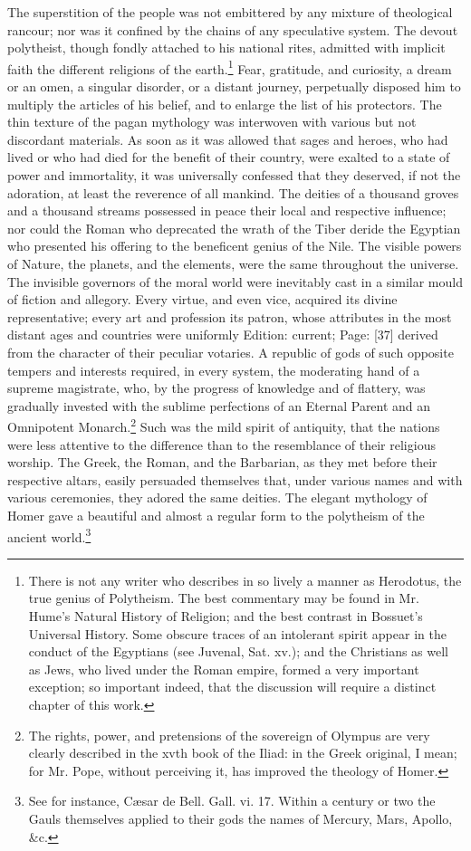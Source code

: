 The superstition of the people was not embittered by any mixture of theological rancour; nor was it confined by the chains of any speculative system. The devout polytheist, though fondly attached to his national rites, admitted with implicit faith the different religions of the earth.\footnote{There is not any writer who describes in so lively a manner as Herodotus, the true genius of Polytheism. The best commentary may be found in Mr. Hume\texthebrew{}’s Natural History of Religion; and the best contrast in Bossuet\texthebrew{}’s Universal History. Some obscure traces of an intolerant spirit appear in the conduct of the Egyptians (see Juvenal, Sat. xv.); and the Christians as well as Jews, who lived under the Roman empire, formed a very important exception; so important indeed, that the discussion will require a distinct chapter of this work.} Fear, gratitude, and curiosity, a dream or an omen, a singular disorder, or a distant journey, perpetually disposed him to multiply the articles of his belief, and to enlarge the list of his protectors. The thin texture of the pagan mythology was interwoven with various but not discordant materials. As soon as it was allowed that sages and heroes, who had lived or who had died for the benefit of their country, were exalted to a state of power and immortality, it was universally confessed that they deserved, if not the adoration, at least the reverence of all mankind. The deities of a thousand groves and a thousand streams possessed in peace their local and respective influence; nor could the Roman who deprecated the wrath of the Tiber deride the Egyptian who presented his offering to the beneficent genius of the Nile. The visible powers of Nature, the planets, and the elements, were the same throughout the universe. The invisible governors of the moral world were inevitably cast in a similar mould of fiction and allegory. Every virtue, and even vice, acquired its divine representative; every art and profession its patron, whose attributes in the most distant ages and countries were uniformly Edition: current; Page: [37] derived from the character of their peculiar votaries. A republic of gods of such opposite tempers and interests required, in every system, the moderating hand of a supreme magistrate, who, by the progress of knowledge and of flattery, was gradually invested with the sublime perfections of an Eternal Parent and an Omnipotent Monarch.\footnote{The rights, power, and pretensions of the sovereign of Olympus are very clearly described in the xvth book of the Iliad: in the Greek original, I mean; for Mr. Pope, without perceiving it, has improved the theology of Homer.} Such was the mild spirit of antiquity, that the nations were less attentive to the difference than to the resemblance of their religious worship. The Greek, the Roman, and the Barbarian, as they met before their respective altars, easily persuaded themselves that, under various names and with various ceremonies, they adored the same deities. The elegant mythology of Homer gave a beautiful and almost a regular form to the polytheism of the ancient world.\footnote{See for instance, Cæsar de Bell. Gall. vi. 17. Within a century or two the Gauls themselves applied to their gods the names of Mercury, Mars, Apollo, \&c.}

